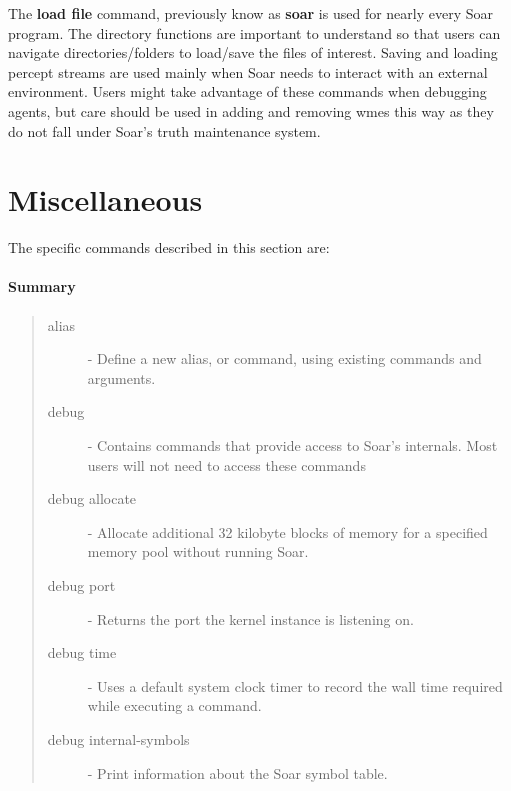 The \textbf{load file} command, previously know as \textbf{soar} is used for nearly every Soar program.  The
directory functions are important to understand so that users can
navigate directories/folders to load/save the files of interest.  
Saving and loading percept streams are used mainly  when Soar needs to interact with an
external environment.  Users might take advantage of these commands when
debugging agents, but care should be used in adding and removing wmes this
way as they do not fall under Soar's truth maintenance system.






\section{Miscellaneous}
\label{MISC}



The specific commands described in this section are:


\paragraph{Summary}
\begin{quote}
\begin{description}
\item[alias] - Define a new alias, or command, using existing commands and arguments.
\item[debug] - Contains commands that provide access to Soar's internals. Most users will not need to access these commands
\item[debug allocate] - Allocate additional 32 kilobyte blocks of memory for a specified memory pool without running Soar.
\item[debug port] - Returns the port the kernel instance is listening on.
\item[debug time] - Uses a default system clock timer to record the wall time required while executing a command.
\item[debug internal-symbols] - Print information about the Soar symbol table.
\end{description}
\end{quote}



